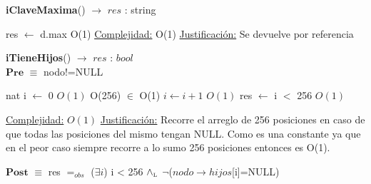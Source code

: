 \begin{algorithm}[H]{\textbf{iClaveMaxima}() $\to$ $res$ : string}
	\begin{algorithmic}[1]
		\State res $\gets$ d.max								    \Comment O(1)
		\medskip
		\Statex \underline{Complejidad:} O(1)
		\Statex \underline{Justificación:} Se devuelve por referencia		
    \end{algorithmic}
\end{algorithm}






\begin{algorithm}[H]{\textbf{iTieneHijos}() $\to$ $res$ : $bool$}
	{\\ $\textbf{Pre}$ $\equiv$ nodo!=NULL}
	\begin{algorithmic}[1]
		\State nat i $\gets$ 0 \Comment $O(1)$
		 \Comment O(256) $\in$ O(1)
			\State $i \gets i + 1$ \Comment $O(1)$
		\EndWhile
		\State res $\gets$ i $<$ 256     \Comment $O(1)$

		\medskip
		\Statex \underline{Complejidad:} $O(1)$
		\Statex \underline{Justificación:} Recorre el arreglo de 256 posiciones en caso de que todas las posiciones del mismo tengan NULL. Como es una constante ya que en el peor caso siempre recorre a lo sumo 256 posiciones entonces es O(1).

    \end{algorithmic}
    {$\textbf{Post}$ $\equiv$ res $=_{obs}$  ($\exists i$) i < 256 $\land_{\mathrm{\scriptscriptstyle{L}}}$ $\lnot$($nodo \rightarrow hijos$[i]=NULL) }
\end{algorithm}




